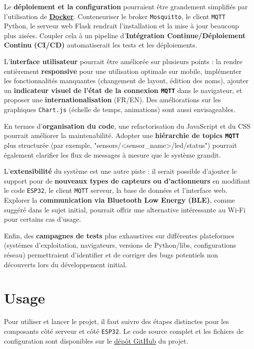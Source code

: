 \documentclass[12pt]{article}
\begin{document}
Le \textbf{déploiement et la configuration} pourraient être grandement simplifiés par l'utilisation de \textbf{\href{https://www.docker.com/}{Docker}}. Conteneuriser le broker \texttt{Mosquitto}, le client \texttt{MQTT} Python, le serveur web Flask rendrait l'installation et la mise à jour beaucoup plus aisées. Coupler cela à un pipeline d'\textbf{Intégration Continue/Déploiement Continu (CI/CD)} automatiserait les tests et les déploiements.

L'\textbf{interface utilisateur} pourrait être améliorée sur plusieurs points : la rendre entièrement \textbf{responsive} pour une utilisation optimale sur mobile, implémenter les fonctionnalités manquantes (changement de layout, édition des noms), ajouter un \textbf{indicateur visuel de l'état de la connexion \texttt{MQTT}} dans le navigateur, et proposer une \textbf{internationalisation} (FR/EN). Des améliorations sur les graphiques \texttt{Chart.js} (échelle de temps, animations) sont aussi envisageables.

En termes d'\textbf{organisation du code}, une refactorisation du JavaScript et du CSS pourrait améliorer la maintenabilité. Adopter une \textbf{hiérarchie de topics \texttt{MQTT}} plus structurée (par exemple, "sensors/<sensor\_name>/led/status") pourrait également clarifier les flux de messages à mesure que le système grandit.

L'\textbf{extensibilité} du système est une autre piste : il serait possible d'ajouter le support pour de \textbf{nouveaux types de capteurs ou d'actionneurs} en modifiant le code \texttt{ESP32}, le client \texttt{MQTT} serveur, la base de données et l'interface web. Explorer la \textbf{communication via Bluetooth Low Energy (BLE)}, comme suggéré dans le sujet initial, pourrait offrir une alternative intéressante au Wi-Fi pour certains cas d'usage.

Enfin, des \textbf{campagnes de tests} plus exhaustives sur différentes plateformes (systèmes d'exploitation, navigateurs, versions de Python/libs, configurations réseau) permettraient d'identifier et de corriger des bugs potentiels non découverts lors du développement initial.

\section{Usage}

Pour utiliser et lancer le projet, il faut suivre des étapes distinctes pour les composants côté serveur et côté \texttt{ESP32}. Le code source complet et les fichiers de configuration sont disponibles sur le \href{https://github.com/GreengagePlum/Project-IOT}{dépôt GitHub} du projet.
\end{document}

